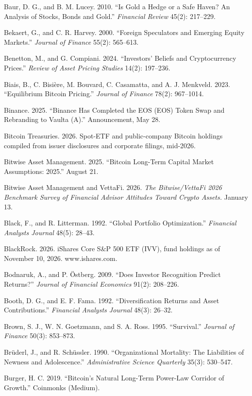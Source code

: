 \documentclass[11pt]{article}
\begin{document}
\begin{list}{}{\setlength{\itemindent}{-1.5em}\setlength{\leftmargin}{1.5em}\setlength{\itemsep}{2pt}\setlength{\parsep}{0pt}}
\item Baur, D. G., and B. M. Lucey. 2010. ``Is Gold a Hedge or a Safe Haven? An Analysis of Stocks, Bonds and Gold.'' \emph{Financial Review} 45(2): 217--229.
\item Bekaert, G., and C. R. Harvey. 2000. ``Foreign Speculators and Emerging Equity Markets.'' \emph{Journal of Finance} 55(2): 565--613.
\item Benetton, M., and G. Compiani. 2024. ``Investors' Beliefs and Cryptocurrency Prices.'' \emph{Review of Asset Pricing Studies} 14(2): 197--236.
\item Biais, B., C. Bisi\`ere, M. Bouvard, C. Casamatta, and A. J. Menkveld. 2023. ``Equilibrium Bitcoin Pricing.'' \emph{Journal of Finance} 78(2): 967--1014.
\item Binance. 2025. ``Binance Has Completed the EOS (EOS) Token Swap and Rebranding to Vaulta (A).'' Announcement, May 28.
\item Bitcoin Treasuries. 2026. Spot-ETF and public-company Bitcoin holdings compiled from issuer disclosures and corporate filings, mid-2026.
\item Bitwise Asset Management. 2025. ``Bitcoin Long-Term Capital Market Assumptions: 2025.'' August 21.
\item Bitwise Asset Management and VettaFi. 2026. \emph{The Bitwise/VettaFi 2026 Benchmark Survey of Financial Advisor Attitudes Toward Crypto Assets.} January 13.
\item Black, F., and R. Litterman. 1992. ``Global Portfolio Optimization.'' \emph{Financial Analysts Journal} 48(5): 28--43.
\item BlackRock. 2026. iShares Core S\&P 500 ETF (IVV), fund holdings as of November 10, 2026. www.ishares.com.
\item Bodnaruk, A., and P. \"Ostberg. 2009. ``Does Investor Recognition Predict Returns?'' \emph{Journal of Financial Economics} 91(2): 208--226.
\item Booth, D. G., and E. F. Fama. 1992. ``Diversification Returns and Asset Contributions.'' \emph{Financial Analysts Journal} 48(3): 26--32.
\item Brown, S. J., W. N. Goetzmann, and S. A. Ross. 1995. ``Survival.'' \emph{Journal of Finance} 50(3): 853--873.
\item Br\"uderl, J., and R. Sch\"ussler. 1990. ``Organizational Mortality: The Liabilities of Newness and Adolescence.'' \emph{Administrative Science Quarterly} 35(3): 530--547.
\item Burger, H. C. 2019. ``Bitcoin's Natural Long-Term Power-Law Corridor of Growth.'' Coinmonks (Medium).

\end{list}
\end{document}
